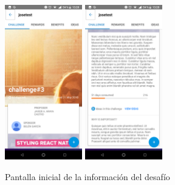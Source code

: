 \begin{figure}[!h]
	\begin{center}
		\includegraphics[width=0.3\textwidth]{./img/anexo1/ver_desafio_inicio.png}
		\includegraphics[width=0.3\textwidth]{./img/anexo1/ver_desafio_inicio_cont.png}
		\caption{Pantalla inicial de la información del desafío}
		\label{fig:ver_desafio_inicio}
	\end{center}
\end{figure}


